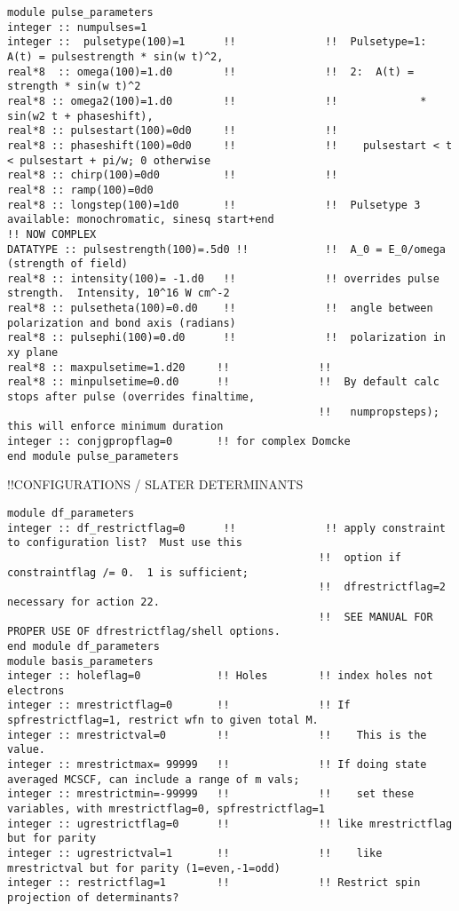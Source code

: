 \begin{verbatim}
module pulse_parameters
integer :: numpulses=1
integer ::  pulsetype(100)=1      !!              !!  Pulsetype=1:  A(t) = pulsestrength * sin(w t)^2,
real*8  :: omega(100)=1.d0        !!              !!  2:  A(t) = strength * sin(w t)^2 
real*8 :: omega2(100)=1.d0        !!              !!             * sin(w2 t + phaseshift),
real*8 :: pulsestart(100)=0d0     !!              !!   
real*8 :: phaseshift(100)=0d0     !!              !!    pulsestart < t < pulsestart + pi/w; 0 otherwise
real*8 :: chirp(100)=0d0          !!              !!
real*8 :: ramp(100)=0d0
real*8 :: longstep(100)=1d0       !!              !!  Pulsetype 3 available: monochromatic, sinesq start+end
!! NOW COMPLEX
DATATYPE :: pulsestrength(100)=.5d0 !!            !!  A_0 = E_0/omega (strength of field)  
real*8 :: intensity(100)= -1.d0   !!              !! overrides pulse strength.  Intensity, 10^16 W cm^-2 
real*8 :: pulsetheta(100)=0.d0    !!              !!  angle between polarization and bond axis (radians)
real*8 :: pulsephi(100)=0.d0      !!              !!  polarization in xy plane
real*8 :: maxpulsetime=1.d20     !!              !!  
real*8 :: minpulsetime=0.d0      !!              !!  By default calc stops after pulse (overrides finaltime,
                                                 !!   numpropsteps); this will enforce minimum duration
integer :: conjgpropflag=0       !! for complex Domcke
end module pulse_parameters
\end{verbatim}
!!{\large \quad CONFIGURATIONS / SLATER DETERMINANTS}
\begin{verbatim}
module df_parameters
integer :: df_restrictflag=0      !!              !! apply constraint to configuration list?  Must use this
                                                 !!  option if constraintflag /= 0.  1 is sufficient;
                                                 !!  dfrestrictflag=2 necessary for action 22. 
                                                 !!  SEE MANUAL FOR PROPER USE OF dfrestrictflag/shell options.
end module df_parameters
module basis_parameters
integer :: holeflag=0            !! Holes        !! index holes not electrons
integer :: mrestrictflag=0       !!              !! If spfrestrictflag=1, restrict wfn to given total M.
integer :: mrestrictval=0        !!              !!    This is the value.
integer :: mrestrictmax= 99999   !!              !! If doing state averaged MCSCF, can include a range of m vals;
integer :: mrestrictmin=-99999   !!              !!    set these variables, with mrestrictflag=0, spfrestrictflag=1
integer :: ugrestrictflag=0      !!              !! like mrestrictflag but for parity
integer :: ugrestrictval=1       !!              !!    like mrestrictval but for parity (1=even,-1=odd)
integer :: restrictflag=1        !!              !! Restrict spin projection of determinants?
\end{verbatim}
